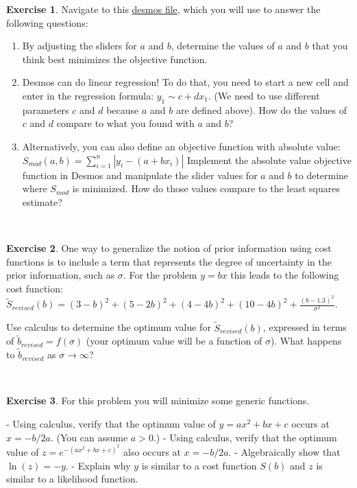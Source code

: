 \documentclass[
]{book}
\theoremstyle{definition}
\theoremstyle{definition}
\theoremstyle{definition}
\newtheorem{exercise}{Exercise}[chapter]
\theoremstyle{remark}
\begin{document}
\begin{exercise}
\protect\hypertarget{exr:unnamed-chunk-180}{}{\label{exr:unnamed-chunk-180} }Navigate to this \href{https://tinyurl.com/day9linearRegression}{desmos file}, which you will use to answer the following questions:

\begin{enumerate}[label=\alph*.]
\item By adjusting the sliders for $a$ and $b$, determine the values of $a$ and $b$ that you think best minimizes the objective function.
\item Desmos can do linear regression!  To do that, you need to start a new cell and enter in the regression formula: $y_{1} \sim c + d x_{1}$.  (We need to use different parameters $c$ and $d$ because $a$ and $b$ are defined above).  How do the values of $c$ and $d$ compare to what you found with $a$ and $b$?
\item Alternatively, you can also define an objective function with absolute value: $\displaystyle S_{mod}(a,b) = \sum_{i=1}^{n} | y_{i}-(a+bx_{i}) |$
Implement the absolute value objective function in Desmos and manipulate the slider values for $a$ and $b$ to determine where $S_{mod}$ is minimized.  How do those values compare to the least squares estimate?
\end{enumerate}
\end{exercise}

~

\begin{exercise}
\protect\hypertarget{exr:unnamed-chunk-181}{}{\label{exr:unnamed-chunk-181} }One way to generalize the notion of prior information using cost functions is to include a term that represents the degree of uncertainty in the prior information, such as \(\sigma\). For the problem \(y=bx\) this leads to the following cost function: \(\displaystyle \tilde{S}_{revised}(b)=(3-b)^2+(5-2b)^2+(4-4b)^2+(10-4b)^2 + \frac{(b-1.3)^2}{\sigma^{2}}\).

Use calculus to determine the optimum value for \(\tilde{S}_{revised}(b)\), expressed in terms of \(\tilde{b}_{revised} = f(\sigma)\) (your optimum value will be a function of \(\sigma\)). What happens to \(\tilde{b}_{revised}\) as \(\sigma \rightarrow \infty\)?
\end{exercise}
~

\begin{exercise}
\protect\hypertarget{exr:unnamed-chunk-182}{}{\label{exr:unnamed-chunk-182} }For this problem you will minimize some generic functions.

\begin{enumerate}[label=\alph*.]
- Using calculus, verify that the optimum value of $y=ax^{2}+bx+c$ occurs at $x=-b/2a$.  (You can assume $a>0$.)
- Using calculus, verify that the optimum value of $z=e^{-(ax^{2}+bx+c)^{2}}$ also occurs at $x=-b/2a$.
- Algebraically show that $\ln(z) = -y$.
- Explain why $y$ is similar to a cost function $S(b)$ and $z$ is similar to a likelihood function.
\end{enumerate}
\end{exercise}
\end{document}
